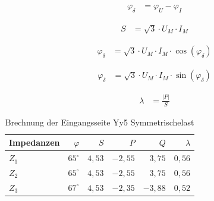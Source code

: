 \begin{enumerate}[label=\alph*)]
	      \begin{minipage}{0.5\textwidth}
		      \begin{center}
			      \begin{align*}
				      \varphi_{\delta} & = \varphi_{U} - \varphi_{I}
			      \end{align*}
		      \end{center}
	      \end{minipage}
	      \begin{minipage}{0.5\textwidth}
		      \begin{center}
			      \begin{align*}
				      S & = \sqrt{3}\cdot U_M\cdot I_M
			      \end{align*}
		      \end{center}
	      \end{minipage}
	      \begin{minipage}{0.5\textwidth}
		      \begin{center}
			      \begin{align*}
				      \varphi_{\delta} & = \sqrt{3}\cdot U_M\cdot I_M\cdot\cos(\varphi_{\delta})
			      \end{align*}
		      \end{center}
	      \end{minipage}
	      \begin{minipage}{0.5\textwidth}
		      \begin{center}
			      \begin{align*}
				      \varphi_{\delta} & = \sqrt{3}\cdot U_M\cdot I_M\cdot\sin(\varphi_{\delta})
			      \end{align*}
		      \end{center}
	      \end{minipage}
	      \begin{center}
		      \begin{minipage}{0.5\textwidth}
			      \begin{center}
				      \begin{align*}
					      \lambda & = \frac{|P|}{S}
				      \end{align*}
			      \end{center}
		      \end{minipage}
	      \end{center}

	      \begin{table}[h!]
		      \caption{Brechnung der Eingangsseite Yy5 Symmetrischelast}
		      \centering
		      \begin{tabular}{lrrrrr}
			      \hline
			      Impedanzen & $\varphi$    & $S$    & $P$      & $Q$      & $\lambda$ \\ \hline
			      $Z_1$      & $65  ^\circ$ & $4,53$ & $-2,55$  & $ 3,75 $ & $0,56$    \\
			      $Z_2$      & $65^\circ$   & $4,53$ & $-2,55 $ & $ 3,75$  & $0,56$    \\
			      $Z_3$      & $67^\circ  $ & $4,53$ & $-2,35$  & $ -3,88$ & $0,52$    \\ \hline
		      \end{tabular}
	      \end{table}


\end{enumerate}

